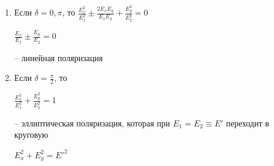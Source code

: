 \documentclass[10pt,pdf,hyperref={unicode}, dvipsnames, handout]{beamer}
\begin{document}
\begin{frame}
		\begin{enumerate}
		\item Если $\delta=0, \pi$, то
		$\frac{E_x^2}{E_1^2}\pm\frac{2E_xE_y}{E_1E_2}+\frac{E_y^2}{E_2^2}=0$\\
		\begin{center}
			$\frac{E_x}{E_1}\pm\frac{E_y}{E_2}=0$\\
		\end{center}
		-- линейная поляризация
		\item Если $\delta=\frac{\pi}{2}$, то\\
		\begin{center}
			$\frac{E_x^2}{E_1^2}+\frac{E_y^2}{E_2^2}=1$\\
		\end{center}
		-- эллиптическая поляризация, которая при $E_1=E_2 \equiv E'$ переходит в круговую
		\begin{center}
			$E_x^2+E_y^2=E'^2$\\
		\end{center}
		\end{enumerate}		
\end{frame}
\end{document}
